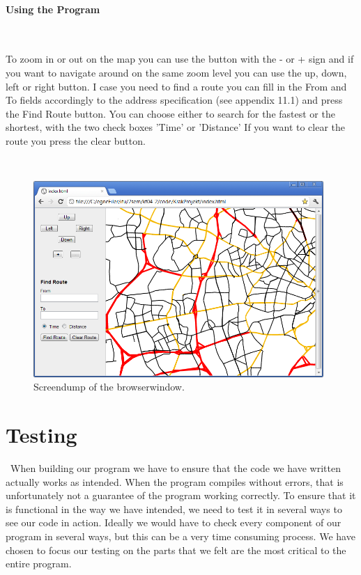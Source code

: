 \documentclass[a4paper,10pt,titlepage]{article}
\begin{document}
		\paragraph{Using the Program}\mbox{}\
		
		To zoom in or out on the map you can use the button with the - or + sign and if you want to navigate around on the same zoom level you can use the up, down, left or right button. I case you need to find a route you can fill in the From and To fields accordingly to the address specification (see appendix 11.1) and press the Find Route button. You can choose either to search for the fastest or the shortest, with the two check boxes 'Time' or 'Distance' If you want to clear the route you press the clear button.

		 \mbox{}\\
		
		\begin{figure}[H]
\includegraphics[width=110mm]{screendump.png}
\caption{Screendump of the browserwindow.}
\label{fig:screendump}
\end{figure}
		
		
	\newpage
	\section{Testing}\mbox{}\
	When building our program we have to ensure that the code we have written actually works as intended. When the program compiles without errors, that is unfortunately not a guarantee of the program working correctly. To ensure that it is functional in the way we have intended, we need to test it in several ways to see our code in action. Ideally we would have to check every component of our program in several ways, but this can be a very time consuming process. We have chosen to focus our testing on the parts that we felt are the most critical to the entire program.
\end{document}
